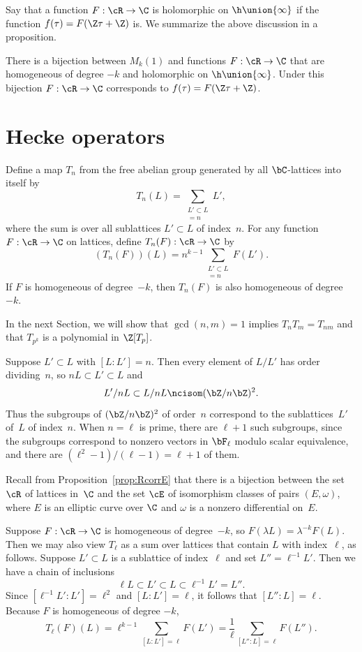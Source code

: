 \documentclass{report}
\begin{document}
Say that a function $F:\cR\to \C$ is holomorphic on
$\h\union\{\infty\}$ if the function $f(\tau)=F(\Z\tau+\Z)$ is. We
summarize the above discussion in a proposition.
\begin{proposition}
There is a bijection between $M_k(1)$ and functions $F:\cR\to \C$
that are homogeneous of degree $-k$ and holomorphic on
$\h\union\{\infty\}$.  Under this bijection $F:\cR\to\C$
corresponds to $f(\tau)=F(\Z\tau+\Z)$.
\end{proposition}

\section{Hecke operators} Define a map $T_n$ from the free
abelian group generated by all $\bC$-lattices into itself by
\[
  T_n(L)= \sum_{\substack{L'\subset L\\  [L:L']=n}} L',
\]
where the sum is over all sublattices $L'\subset L$ of index~$n$.
For any function $F:\cR\to\C$ on lattices, define
$T_n(F):\cR\to\C$  by
\[
  (T_n(F))(L)=n^{k-1}\sum_{\substack{L'\subset L\\  [L:L']=n}} F(L').
\]
If $F$ is homogeneous of degree~$-k$, then $T_n(F)$ is also
homogeneous of degree~$-k$.

In the next Section, we will show that $\gcd(n,m)=1$ implies
$T_nT_m=T_{nm}$ and that $T_{p^k}$ is a polynomial in $\Z[T_p]$.

Suppose $L'\subset L$ with $[L:L']=n$.  Then
every element of $L/L'$ has order dividing~$n$, so $nL\subset
L'\subset L$  and
\[
  L'/nL\subset L/nL\ncisom (\bZ/n\bZ)^2.
\]
Thus the subgroups of $(\bZ/n\bZ)^2$ of order~$n$ correspond to
the sublattices~$L'$ of~$L$ of index~$n$. When $n=\ell$ is prime,
there are $\ell+1$ such subgroups, since the subgroups correspond
to nonzero vectors in $\bF_{\ell}$ modulo scalar equivalence, and
there are $(\ell^2-1)/(\ell-1)=\ell+1$ of them.


Recall from Proposition~\ref{prop:RcorrE} that there is a
bijection between the set $\cR$ of lattices in~$\C$ and the set
$\cE$ of isomorphism classes of pairs $(E,\omega)$, where $E$
is an elliptic curve over $\C$ and $\omega$
is a nonzero differential on~$E$.

Suppose $F:\cR\to\C$ is homogeneous of degree~$-k$, so $F(\lambda
L)=\lambda^{-k} F(L)$. Then we may also view $T_\ell$ as a sum
over lattices that contain $L$ with index~$\ell$, as follows.
Suppose $L'\subset L$ is a sublattice of index~$\ell$ and set
$L''=\ell^{-1}L'$.  Then we have a chain of inclusions
\[
  \ell L \subset L' \subset L \subset \ell^{-1} L' = L''.
\]
Since $[\ell^{-1}L':L']=\ell^2$ and $[L:L']=\ell$, it follows that
$[L'':L]=\ell$.  Because $F$ is homogeneous of degree $-k$,
\begin{equation}\label{eqn:heckelat}
 T_\ell(F)(L) = \ell^{k-1}\sum_{[L:L']=\ell}F(L')
         = \frac{1}{\ell}\sum_{[L'':L]=\ell}F(L'').
\end{equation}
\end{document}

